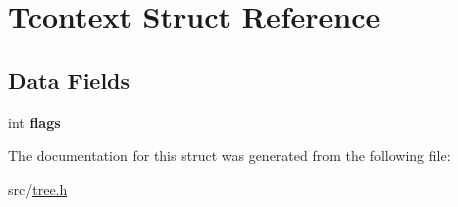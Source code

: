 \hypertarget{structTcontext}{\section{Tcontext Struct Reference}
\label{structTcontext}
}
\subsection*{Data Fields}
\begin{DoxyCompactItemize}
\item 
\hypertarget{structTcontext_a96eb8cbc4b22dddb65f11946916e6c9c}{int {\bfseries flags}}\label{structTcontext_a96eb8cbc4b22dddb65f11946916e6c9c}

\end{DoxyCompactItemize}


The documentation for this struct was generated from the following file\+:\begin{DoxyCompactItemize}
\item 
src/\hyperlink{tree_8h}{tree.\+h}\end{DoxyCompactItemize}
